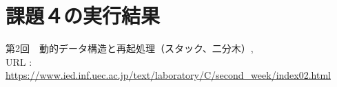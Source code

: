 \documentclass[]{jsarticle}
\begin{document}
\section*{課題４の実行結果}

\newpage
\begin{thebibliography}{99}
   第2回　動的データ構造と再起処理（スタック、二分木）, \\URL : \url{https://www.ied.inf.uec.ac.jp/text/laboratory/C/second_week/index02.html}
\end{thebibliography}
\end{document}
